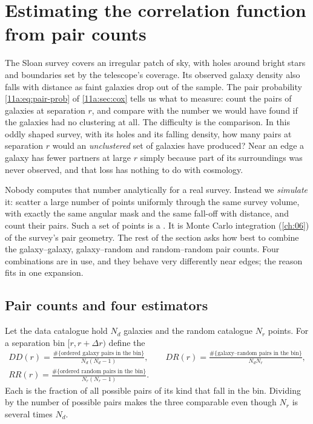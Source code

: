 \section{Estimating the correlation function from pair counts}
\label{11a:sec:xi}

The Sloan survey covers an irregular patch of sky, with holes around bright
stars and boundaries set by the telescope's coverage. Its observed galaxy
density also falls with distance as faint galaxies drop out of the sample. The pair probability \eqref{11a:eq:pair-prob} of
\cref{11a:sec:cox} tells us what to measure: count the pairs of galaxies at
separation $r$, and compare with the number we would have found if the galaxies
had no clustering at all. The difficulty is the comparison. In this oddly shaped
survey, with its holes and its falling density, how many pairs at separation $r$
would an \emph{unclustered} set of galaxies have produced? Near an edge a galaxy
has fewer partners at large $r$ simply because part of its surroundings was never
observed, and that loss has nothing to do with cosmology.

Nobody computes that number analytically for a real survey. Instead we
\emph{simulate} it: scatter a large number of points uniformly through the same
survey volume, with exactly the same angular mask and the same fall-off with
distance, and count their pairs. Such a set of points is a . It is Monte Carlo integration (\cref{ch:06}) of the survey's pair
geometry. The rest of the section asks how best to combine the galaxy--galaxy,
galaxy--random and random--random pair counts. Four combinations are in use, and
they behave very differently near edges; the reason fits in one expansion.

\subsection{Pair counts and four estimators}
\label{11a:sec:xi-estimators}

Let the data catalogue hold $N_d$ galaxies and the random catalogue $N_r$ points.
For a separation bin $[r,r+\Delta r)$ define the 
\begin{equation}
\begin{gathered}
  DD(r)=\frac{\#\{\text{ordered galaxy pairs in the bin}\}}{N_d(N_d-1)},\qquad
  DR(r)=\frac{\#\{\text{galaxy--random pairs in the bin}\}}{N_dN_r},\\[2pt]
  RR(r)=\frac{\#\{\text{ordered random pairs in the bin}\}}{N_r(N_r-1)} .
\end{gathered}
  \label{11a:eq:dd-dr-rr}
\end{equation}
Each is the fraction of all possible pairs of its kind that fall in the bin.
Dividing by the number of possible pairs makes the three comparable even though
$N_r$ is several times $N_d$.

